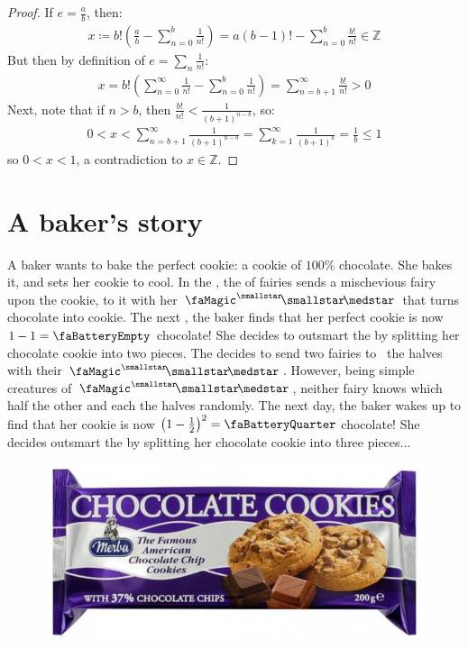 \documentclass[12pt,a4paper]{amsart}
\theoremstyle{definition}
\theoremstyle{remark}
\def \Z{\mathbb{Z}}
\begin{document}
\begin{proof}
  If $e=\frac ab$, then:
  \begin{align*}
    x\coloneq b!\left(\frac{a}{b}-\sum_{n=0}^b \frac{1}{n!}\right)
    =a(b-1)!-\sum_{n=0}^b \frac{b!}{n!}\in \Z
  \end{align*}
  But then by definition of $e=\sum_n\frac{1}{n!}$:
  \begin{align*}
    x = b!\left(\sum_{n=0}^{\infty}\frac{1}{n!}-
    \sum_{n=0}^b \frac{1}{n!}\right)
    =\sum_{n=b+1}^{\infty}\frac{b!}{n!}>0
  \end{align*}
  Next, note that if $n>b$, then $\frac{b!}{n!}<\frac{1}{(b+1)^{n-b}}$, 
  so:
  \begin{align*}
    0<x<\sum_{n=b+1}^{\infty} \frac{1}{(b+1)^{n-b}}
    =\sum_{k=1}^{\infty}\frac{1}{(b+1)^k}=\frac{1}{b}\le  1
  \end{align*}
  so $0<x<1$, a contradiction to $x\in \Z$.
\end{proof}
\newpage
\section{A baker's story}
{\small
A baker wants to bake the perfect cookie: a cookie of $100\%$ chocolate. 
She bakes it, and sets her cookie to cool. In the \faMoonO {}, the 
\queen {} of fairies sends a 
mischevious fairy upon the cookie, to \faBolt {} it with her 
\faMagic $\faMagic^\smallstar\!\smallstar\!\medstar$ 
that turns chocolate into cookie. The next \faSunO, the baker 
finds that her perfect cookie is now $1-1=\text{\faBatteryEmpty}$ 
chocolate! She decides to outsmart the \queen{} by 
splitting her \faBatteryFull{} chocolate cookie 
into two pieces. The \queen {} decides to send two 
fairies to \faBolt \ the halves with their 
\faMagic $\faMagic^\smallstar\!\smallstar\!\medstar$. 
However, being simple creatures of 
$\faMagic^\smallstar\!\smallstar\!\medstar$, neither 
fairy knows which half the other \faBolt{} and each 
\faBolt{} the halves randomly. The next day, the 
baker wakes up to find that her \faBatteryFull{} cookie is now 
$\left(1-\frac{1}{2}\right)^2=\text{\faBatteryQuarter}$ chocolate! She 
decides outsmart the \queen{} by splitting her \faBatteryFull{} 
chocolate cookie into three pieces...}
\begin{center}
  \begin{figure}[ht]
    \includegraphics[width=.65\linewidth]{cookies.png}
  \end{figure}
\end{center}
\newpage
\end{document}
